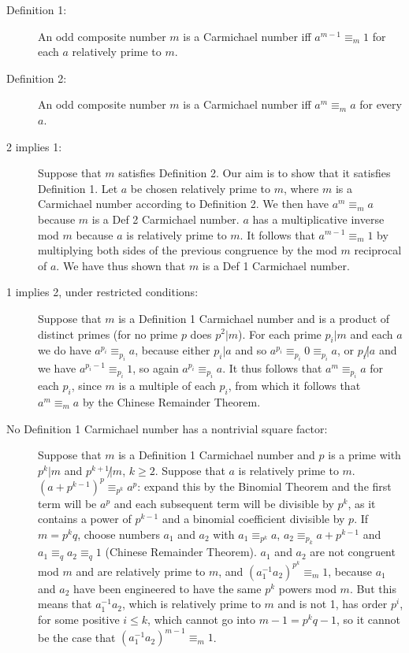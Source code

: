 \documentclass[12pt]{article}
\begin{document}
\begin{description}

\item[Definition 1:]  An odd composite number $m$ is a Carmichael number iff $a^{m-1} \equiv_m 1$ for each $a$ relatively prime to $m$.

\item[Definition 2:]  An odd composite number $m$ is a Carmichael number iff $a^m \equiv_m a$ for every $a$.

\item[2 implies 1:]  Suppose that $m$ satisfies Definition 2.  Our aim is to show that it satisfies Definition 1.  Let $a$ be chosen relatively prime to $m$, where $m$ is a Carmichael number according to Definition 2.  We then have $a^m \equiv_m a$ because $m$ is a Def 2 Carmichael number.  $a$ has a multiplicative inverse mod $m$ because $a$ is relatively prime to $m$.
It follows that $a^{m-1} \equiv_m 1$ by multiplying both sides of the previous congruence by the mod $m$ reciprocal of $a$.  We have thus shown that $m$ is a Def 1 Carmichael number.

\item[1 implies 2, under restricted conditions:]  Suppose that $m$ is a Definition 1 Carmichael number and is a product of distinct primes (for no prime $p$ does $p^2|m$).
For each prime $p_i |m$ and each $a$ we do have $a^{p_i}\equiv_{p_i} a$, because either $p_i |a$ and so $a^{p_i} \equiv_{p_i} 0 \equiv_{p_i} a$, or $p_i \not| a$ and we have $a^{p_i-1}\equiv_{p_i} 1$, so again $a^{p_i}\equiv_{p_i} a$.  It thus follows that $a^m \equiv_{p_i} a$ for each $p_i$, since $m$ is a multiple of each $p_i$, from which it follows
that $a^m \equiv_m a$ by the Chinese Remainder Theorem.

\item[No Definition 1 Carmichael number has a nontrivial square factor:]  Suppose that $m$ is a Definition 1 Carmichael number and $p$ is a prime with $p^k | m$ and $p^{k+1}\not|m$, $k \geq 2$.  Suppose that
$a$ is relatively prime to $m$.   $(a+p^{k-1})^p \equiv_{p^k} a^p$:  expand this by the Binomial Theorem and the first term will be $a^p$ and each subsequent term will be divisible by $p^k$,
as it contains a power of $p^{k-1}$ and a binomial coefficient divisible by $p$.   If $m=p^kq$, choose numbers $a_1$ and $a_2$ with $a_1 \equiv_{p^k} a$, $a_2 \equiv_{p_k} a+p^{k-1}$
and $a_1 \equiv_q a_2 \equiv_q 1$ (Chinese Remainder Theorem).  $a_1$ and $a_2$ are not congruent mod $m$ and are relatively prime to $m$, and $(a_1^{-1}a_2)^{p^k} \equiv_m 1$,
because $a_1$ and $a_2$ have been engineered to have the same $p^k$ powers mod $m$.  But this means that $a_1^{-1}a_2$, which is relatively prime to $m$ and is not 1, has order 
$p^i$, for some positive $i \leq k$, which cannot go into $m-1=p^kq-1$, so it cannot be the case that $(a_1^{-1}a_2)^{m-1} \equiv_m 1$.

\end{description}
\end{document}
